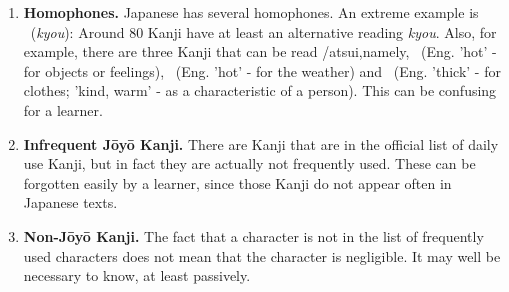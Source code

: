 \begin{enumerate}
  \item \textbf{Homophones.} Japanese has several homophones. An extreme example
        is ~(\emph{kyou}): Around 80 Kanji have at least an 
        alternative reading \emph{kyou}. 
        Also, for example, there are three Kanji 
        that can be read /atsui,namely, 
        ~(Eng. 'hot' - for objects or feelings), 
        ~(Eng. 'hot' - for the weather) and 
        ~(Eng. 'thick' - for clothes; 'kind, warm' - as a 
        characteristic of a person). This can be confusing for a learner.

  \item \textbf{Infrequent Jōyō Kanji.} There are Kanji that are in the official
        list of daily use Kanji, but in fact they are actually not frequently 
        used. These can be forgotten easily by a learner, since those Kanji do 
        not appear often in Japanese texts.

  \item \textbf{Non-Jōyō Kanji.} The fact that a character is not in the list 
        of frequently used characters does not mean that the character is 
        negligible. It may well be necessary to know, at least passively.
\end{enumerate}

